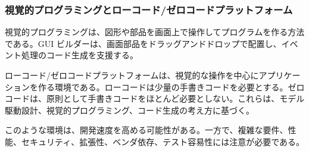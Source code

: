 \subsubsection{視覚的プログラミングとローコード/ゼロコードプラットフォーム}

視覚的プログラミングは、図形や部品を画面上で操作してプログラムを作る方法である。GUI ビルダーは、画面部品をドラッグアンドドロップで配置し、イベント処理のコード生成を支援する。

ローコード/ゼロコードプラットフォームは、視覚的な操作を中心にアプリケーションを作る環境である。ローコードは少量の手書きコードを必要とする。ゼロコードは、原則として手書きコードをほとんど必要としない。これらは、モデル駆動設計、視覚的プログラミング、コード生成の考え方に基づく。

このような環境は、開発速度を高める可能性がある。一方で、複雑な要件、性能、セキュリティ、拡張性、ベンダ依存、テスト容易性には注意が必要である。
